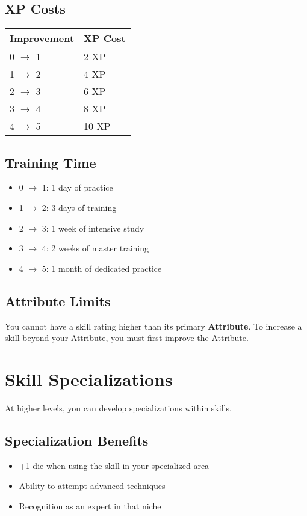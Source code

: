 \begin{multicols}{2}
\subsection*{XP Costs}
\begin{center}
\small
\begin{tabular}{ll}
\toprule
\textbf{Improvement} & \textbf{XP Cost} \\
\midrule
0 $\rightarrow$ 1 & 2 XP \\
1 $\rightarrow$ 2 & 4 XP \\
2 $\rightarrow$ 3 & 6 XP \\
3 $\rightarrow$ 4 & 8 XP \\
4 $\rightarrow$ 5 & 10 XP \\
\bottomrule
\end{tabular}
\end{center}

\subsection*{Training Time}
\begin{itemize}
\item 0 $\rightarrow$ 1: 1 day of practice
\item 1 $\rightarrow$ 2: 3 days of training
\item 2 $\rightarrow$ 3: 1 week of intensive study
\item 3 $\rightarrow$ 4: 2 weeks of master training
\item 4 $\rightarrow$ 5: 1 month of dedicated practice
\end{itemize}

\subsection*{Attribute Limits}
You cannot have a skill rating higher than its primary \textbf{Attribute}. To increase a skill beyond your Attribute, you must first improve the Attribute.

\section{Skill Specializations}

At higher levels, you can develop specializations within skills.

\subsection*{Specialization Benefits}
\begin{itemize}
\item +1 die when using the skill in your specialized area
\item Ability to attempt advanced techniques
\item Recognition as an expert in that niche
\end{itemize}


\end{multicols}
